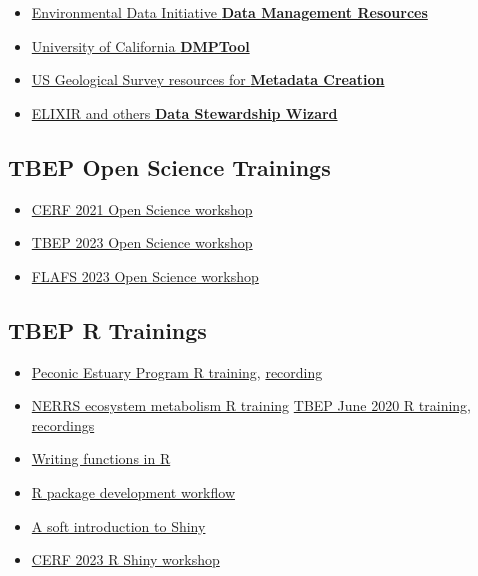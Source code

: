 \documentclass[
]{book}
\providecommand{\tightlist}{%
  \setlength{\itemsep}{0pt}\setlength{\parskip}{0pt}}
\begin{document}
\begin{itemize}
\tightlist
\item
  \href{https://environmentaldatainitiative.org/dm-resources/}{Environmental Data Initiative \textbf{Data Management Resources}}
\item
  \href{https://dmptool.org/}{University of California \textbf{DMPTool}}
\item
  \href{https://www.usgs.gov/products/data-and-tools/data-management/metadata-creation}{US Geological Survey resources for \textbf{Metadata Creation}}
\item
  \href{https://ds-wizard.org/}{ELIXIR and others \textbf{Data Stewardship Wizard}}
\end{itemize}

\subsection{TBEP Open Science Trainings}\label{tbep-open-science-trainings}

\begin{itemize}
\tightlist
\item
  \href{https://tbep-tech.github.io/cerf-os-workshop/}{CERF 2021 Open Science workshop}
\item
  \href{https://tbep-tech.github.io/tbep-os-workshop/}{TBEP 2023 Open Science workshop}
\item
  \href{https://tbep-tech.github.io/flafs-os-workshop/}{FLAFS 2023 Open Science workshop}
\end{itemize}

\subsection{TBEP R Trainings}\label{tbep-r-trainings}

\begin{itemize}
\tightlist
\item
  \href{https://tbep-tech.github.io/pep-r-training}{Peconic Estuary Program R training}, \href{https://drive.google.com/file/d/1ZjVHFrVpw2uTKZw-BmD29umdbl6viutM/view?usp=sharing}{recording}
\item
  \href{https://tbep-tech.github.io/ecometab-r-training}{NERRS ecosystem metabolism R training}
  \href{https://tbep-tech.github.io/tbep-r-training/}{TBEP June 2020 R training}, \href{https://www.youtube.com/watch?v=_RI4XMRWeV0&list=PLfJ6-D-exF9RM5TPtT4T0nxieqpr_R4pJ}{recordings}
\item
  \href{https://tbep-tech.github.io/tbep-r-training/functions.html}{Writing functions in R}
\item
  \href{https://tbep-tech.github.io/tbep-r-training/packages.html}{R package development workflow}
\item
  \href{https://tbep-tech.github.io/tbep-r-training/shiny.html}{A soft introduction to Shiny}
\item
  \href{https://tbep-tech.github.io/shiny-workshop/}{CERF 2023 R Shiny workshop}
\end{itemize}
\end{document}
